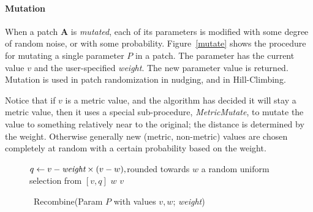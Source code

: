 \documentclass{article}
\begin{document}
{\paragraph{Mutation}
When a patch {\bf A} is {\it mutated}, each of its parameters is modified with some degree of random noise, or with some probability.  Figure~\ref{mutate} shows the procedure for mutating a single parameter \(P\) in a patch.  The parameter has the current value \(v\) and the user-specified {\it weight}.  The new parameter value is returned.  Mutation is used in patch randomization in nudging, and in Hill-Climbing.

Notice that if \(v\) is a metric value, and the algorithm has decided it will stay a metric value, then it uses a special sub-procedure, {\it MetricMutate}, to mutate the value to something relatively near to the original; the distance is determined by the weight.  Otherwise generally new (metric, non-metric) values are chosen completely at random with a certain probability based on the weight.


\begin{figure}[t]
\begin{minipage}{\linewidth}
\begin{minipage}[t]{\linewidth}%
\begin{algorithm}[H]
   \caption{~Recombine(Param \(P\) with values \(v, w\); {\it weight})}
   \label{alg:recombine}
\begin{algorithmic}
    	\STATE \(q \leftarrow v - \text{\it weight} \times (v - w),\)\quad rounded towards \(w\)
    	 a random uniform selection from \([v, q ]\)
 \(w\)
     \ENDIF
	 \(v\)


\end{algorithmic}
\end{algorithm}
\end{minipage}
\end{minipage}
\end{figure}}
\end{document}
